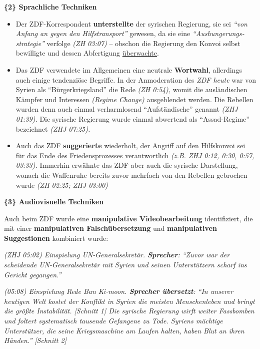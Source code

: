 \textbf{\{2\} Sprachliche Techniken}

\begin{itemize}
\tightlist
\item
  Der ZDF-Korrespondent \textbf{unterstellte} der syrischen Regierung,
  sie sei \emph{``von Anfang an gegen den Hilfstransport''} gewesen, da
  sie eine \emph{``Aushungerungs­strategie''} verfolge \emph{(ZH 03:07)}
  -- obschon die Regierung den Konvoi selbst bewilligte und dessen
  Abfertigung
  \href{http://blauerbote.com/2016/09/24/medien-verschweigen-attackierter-hilfskonvoi-startete-in-gebiet-der-syrischen-regierung/}{überwachte}.
\item
  Das ZDF verwendete im Allgemeinen eine neutrale \textbf{Wortwahl},
  allerdings auch einige tendenziöse Begriffe. In der Anmoderation des
  \emph{ZDF heute} war von Syrien als ``Bürger­kriegs­land'' die Rede
  \emph{(ZH 0:54),} womit die ausländischen Kämpfer und Interessen
  \emph{(Regime Change)} ausgeblendet werden. Die Rebellen wurden denn
  auch einmal verharmlosend ``Aufständische'' genannt \emph{(ZHJ
  01:39).} Die syrische Regierung wurde einmal abwertend als
  ``Assad-Regime'' bezeichnet \emph{(ZHJ 07:25).}
\item
  Auch das ZDF \textbf{suggerierte} wiederholt, der Angriff auf den
  Hilfskonvoi sei für das Ende des Friedens­prozesses verantwortlich
  \emph{(z.B. ZHJ 0:12, 0:30, 0:57, 03:33).} Immerhin erwähnte das ZDF
  aber auch die syrische Darstellung, wonach die Waffenruhe bereits
  zuvor mehrfach von den Rebellen gebrochen wurde \emph{(ZH 02:25; ZHJ
  03:00)}
\end{itemize}

\textbf{\{3\} Audiovisuelle Techniken}

Auch beim ZDF wurde eine \textbf{manipulative Video­bearbeitung}
identifiziert, die mit einer \textbf{manipulativen Falsch­übersetzung}
und \textbf{manipulativen Suggestionen} kombiniert wurde:

\emph{(ZHJ 05:02) Einspielung UN-General­sekretär. \textbf{Sprecher}:
``Zuvor war der scheidende UN-General­sekretär mit Syrien und seinen
Unterstützern scharf ins Gericht gegangen.''}

\emph{(05:08) Einspielung Rede Ban Ki-moon. \textbf{Sprecher übersetzt}:
``In unserer heutigen Welt kostet der Konflikt in Syrien die meisten
Menschenleben und bringt die größte Instabilität. {[}Schnitt 1{]} Die
syrische Regierung wirft weiter Fassbomben und foltert systematisch
tausende Gefangene zu Tode. Syriens mächtige Unterstützer, die seine
Kriegsmaschine am Laufen halten, haben Blut an ihren Händen.''
{[}Schnitt 2{]}}

